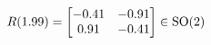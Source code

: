 \documentclass[preview]{standalone}
\begin{document}
\begin{align*}
\special{dvisvgm:raw <g id='unique000'>}R(1.99) = \begin{bmatrix} -0.41 & -0.91 \\ 0.91 & -0.41 \end{bmatrix} \in \text{SO}(2)\special{dvisvgm:raw </g>}
\end{align*}
\end{document}
